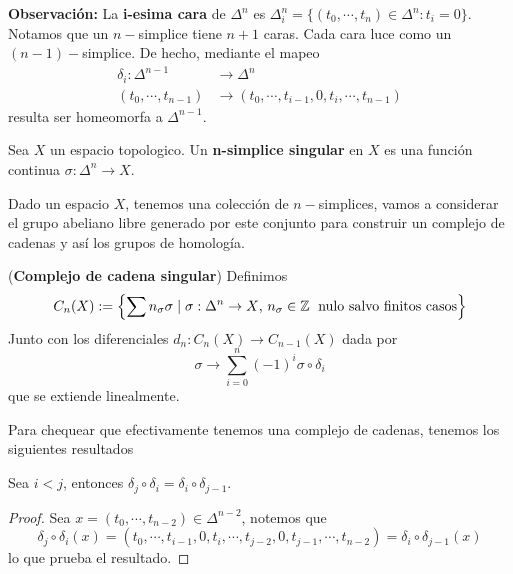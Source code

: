 \documentclass{article}
\begin{document}
\noindent\textbf{Observación:} La \textbf{i-esima cara} de $\Delta^{n}$ es 
$\Delta^{n}_{i}=\{(t_{0},\cdots,t_{n})\in\Delta^{n}:t_{i}=0\}$. Notamos que un $n-$simplice tiene
$n+1$ caras. Cada cara luce como un $(n-1)-$simplice. De hecho, mediante el mapeo
\begin{align*}
    \delta_{i}:\Delta^{n-1} &\to \Delta^{n} \\
    (t_{0},\cdots,t_{n-1}) &\to (t_{0},\cdots,t_{i-1},0,t_{i},\cdots,t_{n-1})
\end{align*}
resulta ser homeomorfa a $\Delta^{n-1}$.

\begin{dfn}
    Sea $X$ un espacio topologico. Un \textbf{n-simplice singular} en $X$ es una función continua
    $\sigma:\Delta^{n}\to X$.
\end{dfn}

\noindent Dado un espacio $X$, tenemos una colección de $n-$simplices, vamos a considerar el grupo
abeliano libre generado por este conjunto para construir un complejo de cadenas y así los grupos
de homología.

\begin{dfn}
    (\textbf{Complejo de cadena singular}) Definimos
    \begin{equation*}
        C_{n}(X):=\left\{\sum n_{\sigma}\sigma\hspace{1mm}|\hspace{1mm}\sigma:\Delta^{n}\to X
        \text{, }n_{\sigma}\in\mathbb{Z}\hspace{1mm}
        \text{ nulo salvo finitos casos}\right\}
    \end{equation*}
    Junto con los diferenciales $d_{n}:C_{n}(X)\to C_{n-1}(X)$ dada por
    \begin{equation*}
        \sigma\to\sum_{i=0}^{n}(-1)^{i}\sigma\circ\delta_{i}
    \end{equation*}
    que se extiende linealmente.
\end{dfn}

\noindent Para chequear que efectivamente tenemos una complejo de cadenas, tenemos los siguientes 
resultados
\begin{lema}
    Sea $i<j$, entonces $\delta_{j}\circ\delta_{i}=\delta_{i}\circ\delta_{j-1}$.
\end{lema}
\begin{proof}
    Sea $x=(t_{0},\cdots,t_{n-2})\in\Delta^{n-2}$, notemos que
    \begin{equation*}
        \delta_{j}\circ\delta_{i}(x)
        =(t_{0},\cdots,t_{i-1},0,t_{i},\cdots,t_{j-2},0,t_{j-1},\cdots,t_{n-2})
        =\delta_{i}\circ\delta_{j-1}(x)
    \end{equation*}
    lo que prueba el resultado.
\end{proof}
\end{document}
